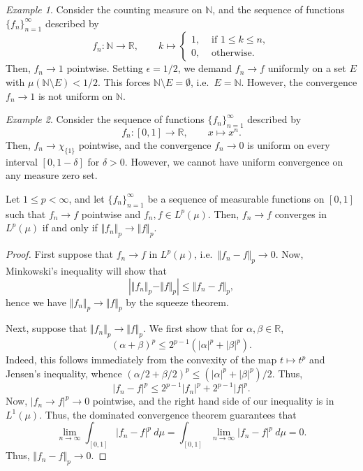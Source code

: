 \documentclass[11pt]{article}
\newcommand{\R}{\mathbb{R}}
\newcommand{\N}{\mathbb{N}}
\newcommand{\norm}[1]{\Vert #1 \Vert}
\theoremstyle{definition}
\theoremstyle{remark}
\newtheorem*{example}{Example}
\numberwithin{equation}{section}
\begin{document}
    \begin{example}
        Consider the counting measure on $\N$, and the sequence of functions
        $\{f_n\}_{n = 1}^\infty$ described by \[
            f_n\colon \N \to \R, \qquad k \mapsto \begin{cases}
                1, &\text{ if } 1 \leq k \leq n, \\
                0, &\text{ otherwise}.
            \end{cases}
        \] Then, $f_n \to 1$ pointwise. Setting $\epsilon = 1 / 2$, we demand $f_n
        \to f$ uniformly on a set $E$ with $\mu(\N\setminus E) < 1 / 2$. This forces
        $\N\setminus E = \emptyset$, i.e.\ $E = \N$. However, the convergence $f_n
        \to 1$ is not uniform on $\N$.
    \end{example}
    \begin{example}
        Consider the sequence of functions $\{f_n\}_{n = 1}^\infty$ described by \[
            f_n\colon [0, 1] \to \R, \qquad x \mapsto x^n.
        \] Then, $f_n \to \chi_{\{1\}}$ pointwise, and the convergence $f_n \to 0$ is
        uniform on every interval $[0, 1 - \delta]$ for $\delta > 0$. However, we
        cannot have uniform convergence on any measure zero set.
    \end{example}


    \begin{theorem}
        Let $1 \leq p < \infty$, and let $\{f_n\}_{n = 1}^\infty$ be a sequence of
        measurable functions on $[0, 1]$ such that $f_n \to f$ pointwise and $f_n, f
        \in L^p(\mu)$. Then, $f_n \to f$ converges in $L^p(\mu)$ if and only if
        $\norm{f_n}_p \to \norm{f}_p$.
    \end{theorem}
    \begin{proof}
        First suppose that $f_n \to f$ in $L^p(\mu)$, i.e.\ $\norm{f_n - f}_p \to 0$.
        Now, Minkowski's inequality will show that \[
            |\norm{f_n}_p - \norm{f}_p| \leq \norm{f_n - f}_p,
        \] hence we have $\norm{f_n}_p \to \norm{f}_p$ by the squeeze theorem.

        Next, suppose that $\norm{f_n}_p \to \norm{f}_p$. We first show that for
        $\alpha, \beta \in \R$, \[
            (\alpha + \beta)^p \leq 2^{p - 1}(|\alpha|^p + |\beta|^p).
        \] Indeed, this follows immediately from the convexity of the map $t \mapsto
        t^p$ and Jensen's inequality, whence $(\alpha / 2 + \beta / 2)^p \leq
        (|\alpha|^p + |\beta|^p) / 2$. Thus, \[
            |f_n - f|^p \leq 2^{p - 1}|f_n|^p + 2^{p - 1}|f|^p.
        \] Now, $|f_n \to f|^p \to 0$ pointwise, and the right hand side of our
        inequality is in $L^1(\mu)$. Thus, the dominated convergence theorem
        guarantees that \[
            \lim_{n \to \infty} \int_{[0, 1]} |f_n - f|^p\:d\mu = \int_{[0, 1]}
            \lim_{n \to \infty} |f_n - f|^p\:d\mu = 0.
        \] Thus, $\norm{f_n - f}_p \to 0$.
    \end{proof}
\end{document}
